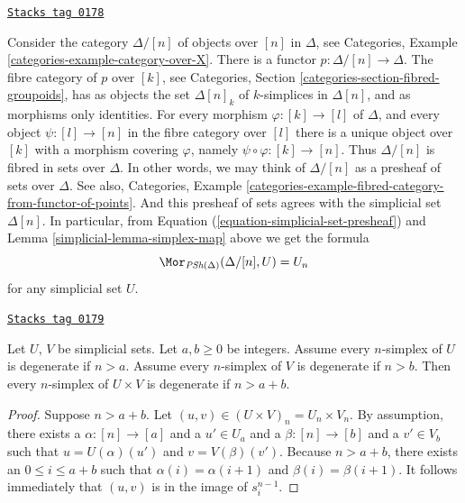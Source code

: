 \begin{example}
\label{simplicial-example-simplex-category}
\href{https://stacks.math.columbia.edu/tag/0178}{\texttt{Stacks tag 0178}}

Consider the category $\Delta/[n]$ of objects over $[n]$
in $\Delta$, see
Categories, Example \ref{categories-example-category-over-X}.
There is a functor $p : \Delta/[n] \to \Delta$.
The fibre category of $p$ over $[k]$, see
Categories, Section \ref{categories-section-fibred-groupoids},
has as objects the
set $\Delta[n]_k$ of $k$-simplices in $\Delta[n]$, and as
morphisms only identities. For every morphism
$\varphi : [k] \to [l]$ of $\Delta$, and every object $\psi : [l] \to [n]$
in the fibre category over $[l]$ there is a unique
object over $[k]$ with a morphism covering $\varphi$, namely
$\psi \circ \varphi : [k] \to [n]$. Thus $\Delta/[n]$
is fibred in sets over $\Delta$. In other words, we may
think of $\Delta/[n]$ as a presheaf of sets over $\Delta$.
See also, Categories,
Example \ref{categories-example-fibred-category-from-functor-of-points}.
And this presheaf of sets agrees with the simplicial set
$\Delta[n]$. In particular, from Equation
(\ref{equation-simplicial-set-presheaf}) and
Lemma \ref{simplicial-lemma-simplex-map} above
we get the formula
$$
\Mor_{\textit{PSh}(\Delta)}(\Delta/[n], U) = U_n
$$
for any simplicial set $U$.
\end{example}

\begin{lemma}
\label{simplicial-lemma-product-degenerate}
\href{https://stacks.math.columbia.edu/tag/0179}{\texttt{Stacks tag 0179}}

Let $U$, $V$ be simplicial sets.
Let $a, b \geq 0$ be integers.
Assume every $n$-simplex of $U$ is degenerate if $n > a$.
Assume every $n$-simplex of $V$ is degenerate if $n > b$.
Then every $n$-simplex of $U \times V$ is degenerate
if $n > a + b$.
\end{lemma}

\begin{proof}
Suppose $n > a + b$. Let $(u, v) \in (U \times V)_n = U_n \times V_n$.
By assumption, there exists a $\alpha : [n] \to [a]$ and a
$u' \in U_a$ and a $\beta : [n] \to [b]$ and a $v' \in V_b$
such that $u = U(\alpha)(u')$ and $v = V(\beta)(v')$. Because
$n > a + b$, there exists an $0 \leq i \leq a + b$ such that
$\alpha(i) = \alpha(i + 1)$ and
$\beta(i) = \beta(i + 1)$. It follows immediately
that $(u, v)$ is in the image of $s^{n - 1}_i$.
\end{proof}

